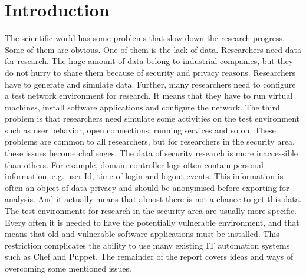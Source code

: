 \section{Introduction}

The scientific world has some problems that slow down the research progress. Some of them are obvious. One of them is the lack of data. Researchers need data for research. The huge amount of data belong to industrial companies, but they do not hurry to share them because of security and privacy reasons. Researchers have to generate and simulate data. Further, many researchers need to configure a test network environment for research. It means that they have to run virtual machines, install software applications and configure the network. The third problem is that researchers need simulate some activities on the test environment such as user behavior, open connections, running services and so on. These problems are common to all researchers, but for researchers in the security area, these issues become challenges. The data of security research is more inaccessible than others. For example, domain controller logs often contain personal information, e.g. user Id, time of login and logout events. This information is often an object of data privacy and should be anonymised before exporting for analysis. And it actually means that almost there is not a chance to get this data. The test environments for research in the security area are usually more specific. Every often it is needed to have the potentially vulnerable environment, and that means that old and vulnerable software applications must be installed. This restriction complicates the ability to use many existing IT automation systems such as Chef and Puppet. The remainder  of the report covers ideas and ways of overcoming some mentioned issues.

